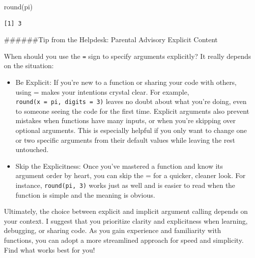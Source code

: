 \documentclass[
  letterpaper,
]{book}
\newenvironment{Shaded}{\begin{snugshade}}{\end{snugshade}}
\newcommand{\FunctionTok}[1]{\textcolor[rgb]{0.28,0.35,0.67}{#1}}
\newcommand{\NormalTok}[1]{\textcolor[rgb]{0.00,0.23,0.31}{#1}}
\begin{document}
\begin{Shaded}
\begin{Highlighting}[]
\FunctionTok{round}\NormalTok{(pi)}
\end{Highlighting}
\end{Shaded}

\begin{verbatim}
[1] 3
\end{verbatim}

\begin{tcolorbox}[enhanced jigsaw, colframe=quarto-callout-tip-color-frame, breakable, arc=.35mm, bottomtitle=1mm, bottomrule=.15mm, colbacktitle=quarto-callout-tip-color!10!white, rightrule=.15mm, colback=white, opacityback=0, opacitybacktitle=0.6, coltitle=black, left=2mm, toptitle=1mm, toprule=.15mm, titlerule=0mm, leftrule=.75mm, title=\textcolor{quarto-callout-tip-color}{\faLightbulb}\hspace{0.5em}{Tip}]

\#\#\#\#\#\#Tip from the Helpdesk: Parental Advisory Explicit Content

When should you use the \texttt{=} sign to specify arguments explicitly?
It really depends on the situation:

\begin{itemize}
\item
  Be Explicit: If you're new to a function or sharing your code with
  others, using = makes your intentions crystal clear. For example,
  \texttt{round(x\ =\ pi,\ digits\ =\ 3)} leaves no doubt about what
  you're doing, even to someone seeing the code for the first time.
  Explicit arguments also prevent mistakes when functions have many
  inputs, or when you're skipping over optional arguments. This is
  especially helpful if you only want to change one or two specific
  arguments from their default values while leaving the rest untouched.
\item
  Skip the Explicitness: Once you've mastered a function and know its
  argument order by heart, you can skip the = for a quicker, cleaner
  look. For instance, \texttt{round(pi,\ 3)} works just as well and is
  easier to read when the function is simple and the meaning is obvious.
\end{itemize}

Ultimately, the choice between explicit and implicit argument calling
depends on your context. I suggest that you prioritize clarity and
explicitness when learning, debugging, or sharing code. As you gain
experience and familiarity with functions, you can adopt a more
streamlined approach for speed and simplicity. Find what works best for
you!

\end{tcolorbox}
\end{document}
